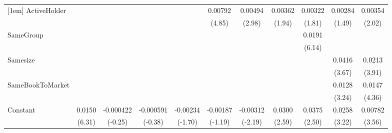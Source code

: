 {\begin{tabular}{l*{10}{c}}
[1em]
ActiveHolder        &                     &                     &                     &                     &     0.00792\sym{***}&     0.00494\sym{**} &     0.00362         &     0.00322         &     0.00284         &     0.00354\sym{*}  \\
                    &                     &                     &                     &                     &      (4.85)         &      (2.98)         &      (1.94)         &      (1.81)         &      (1.49)         &      (2.02)         \\
[1em]
SameGroup           &                     &                     &                     &                     &                     &                     &                     &      0.0191\sym{***}&                     &                     \\
                    &                     &                     &                     &                     &                     &                     &                     &      (6.14)         &                     &                     \\
[1em]
Samesize            &                     &                     &                     &                     &                     &                     &                     &                     &      0.0416\sym{***}&      0.0213\sym{***}\\
                    &                     &                     &                     &                     &                     &                     &                     &                     &      (3.67)         &      (3.91)         \\
[1em]
SameBookToMarket    &                     &                     &                     &                     &                     &                     &                     &                     &      0.0128\sym{**} &      0.0147\sym{***}\\
                    &                     &                     &                     &                     &                     &                     &                     &                     &      (3.24)         &      (4.36)         \\
[1em]
Constant            &      0.0150\sym{***}&   -0.000422         &   -0.000591         &    -0.00234         &    -0.00187         &    -0.00312\sym{*}  &      0.0300\sym{*}  &      0.0375\sym{*}  &      0.0258\sym{**} &     0.00782\sym{***}\\
                    &      (6.31)         &     (-0.25)         &     (-0.38)         &     (-1.70)         &     (-1.19)         &     (-2.19)         &      (2.59)         &      (2.50)         &      (3.22)         &      (3.56)         \\

\end{tabular}}
